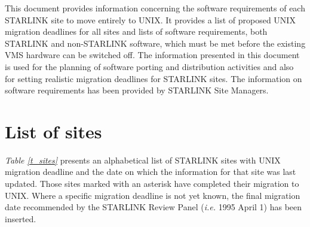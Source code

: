 \vspace{5mm}

This document provides information concerning the software requirements
of each STARLINK site to move entirely to UNIX.
It provides a list of proposed UNIX migration deadlines for all sites and
lists of software requirements, both STARLINK and non-STARLINK software,
which must be met before the existing VMS hardware can be switched off.
The information presented in this document is used for the planning
of software porting and distribution activities and also for setting
realistic migration deadlines for STARLINK sites.
The information on software requirements has been provided by STARLINK Site
Managers.


\newpage

\setlength{\parskip}{0mm}
\tableofcontents
\setlength{\parskip}{\medskipamount}

\newpage
\listoftables
\setlength{\parskip}{\medskipamount}
\markright{\stardocname}

\sloppypar
\newpage
\section{List of sites}

{\em Table \ref{t_sites}} presents an alphabetical list of STARLINK sites with
UNIX migration deadline and the date on which the information for that site
was last updated.
Those sites marked with an asterisk have completed their migration to UNIX.
Where a specific migration deadline is not yet known, the final migration date
recommended by the STARLINK Review Panel ({\em i.e.} 1995 April 1) has been
inserted.

